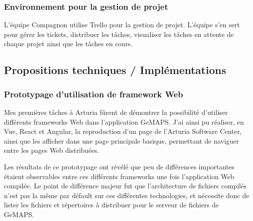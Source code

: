 \documentclass[francais]{rapportPFE}  %
\begin{document}
\subsubsection{Environnement pour la gestion de projet}
L'équipe Compagnon utilise Trello pour la gestion de projet. L'équipe s'en sert pour gérer les tickets, distribuer les tâches, visualiser les tâches en attente de chaque projet ainsi que les tâches en cours.

\subsection{Propositions techniques / Implémentations}
\subsubsection{Prototypage d'utilisation de framework Web}
Mes premières tâches à Arturia fûrent de démontrer la possibilité d'utiliser différents frameworks Web dans l'application GeMAPS.
J'ai ainsi pu réaliser, en Vue, React et Angular, la reproduction d'un page de l'Arturia Software Center, ainsi que les afficher dans une page principale basique, permettant de naviguer entre les pages Web distribuées. 

Les résultats de ce prototypage ont révélé que peu de différences importantes étaient observables entre ces différents frameworks une fois l'application Web compilée. Le point de différence majeur fut que l'architecture de fichiers compilés n'est pas la même par défault sur ces différentes technologies, et nécessite donc de lister les fichiers et répertoires à distribuer pour le serveur de fichiers de GeMAPS.
\end{document}
